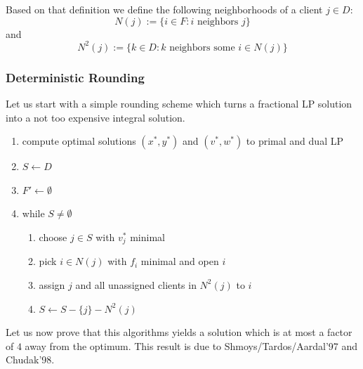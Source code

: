\documentclass{article}
\begin{document}
Based on that definition we define the following neighborhoods of a client $j\in D$:
\[
	N(j):=\{i\in F: i\mbox{ neighbors } j\}
\]
and
\[
	N^2(j):=\{k\in D: k\mbox{ neighbors some } i\in N(j)\}
\]

\subsubsection{Deterministic Rounding}
Let us start with a simple rounding scheme which turns a fractional LP solution into a not too expensive integral solution.
\begin{enumerate}
\item compute optimal solutions $(x^*, y^*)$ and $(v^*,w^*)$ to primal and dual LP
\item $S\leftarrow D$
\item $F'\leftarrow\emptyset$
\item while $S\neq \emptyset$
	\begin{enumerate}
	\item choose $j\in S$ with $v_j^*$ minimal
	\item pick $i\in N(j)$ with $f_i$ minimal and open $i$
	\item assign $j$ and all unassigned clients in $N^2(j)$ to $i$
	\item $S\leftarrow S-\{j\}-N^2(j)$
	\end{enumerate}
\end{enumerate}

Let us now prove that this algorithms yields a solution which is at most a factor of $4$ away from the optimum. This result is due to Shmoys/Tardos/Aardal'97 and Chudak'98.
\end{document}
